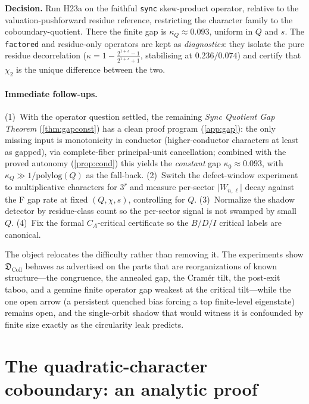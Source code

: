 \documentclass[11pt]{article}
\newcommand{\Dcoll}{\mathfrak{D}_{\mathrm{Coll}}}
\theoremstyle{plain}
\theoremstyle{remark}
\begin{document}
\begin{keystatement}
\textbf{Decision.} Run H23a on the faithful \texttt{sync} skew-product operator,
relative to the valuation-pushforward residue reference, restricting the
character family to the coboundary-quotient. There the finite gap is
$\kappa_Q\approx0.093$, uniform in $Q$ and $s$. The \texttt{factored} and
residue-only operators are kept as \emph{diagnostics}: they isolate the pure
residue decorrelation ($\kappa=1-\tfrac{2^{1+s}-1}{2^{1+s}+1}$, stabilising at
$0.236/0.074$) and certify that $\chi_2$ is the unique difference between the two.
\end{keystatement}

\paragraph{Immediate follow-ups.}
(1)~With the operator question settled, the remaining \emph{Sync Quotient Gap
Theorem} (\cref{thm:gapconst}) has a clean proof program (\cref{app:gap}): the
only missing input is monotonicity in conductor (higher-conductor characters at
least as gapped), via complete-fiber principal-unit cancellation; combined with
the proved autonomy (\cref{prop:cond}) this yields the \emph{constant} gap
$\kappa_0\approx0.093$, with $\kappa_Q\gg1/\mathrm{polylog}(Q)$ as the fall-back.
(2)~Switch the defect-window
experiment to multiplicative characters for $3^r$ and measure per-sector
$\lvert W_{n,\ell}\rvert$ decay against the F gap rate at fixed $(Q,\chi,s)$,
controlling for $Q$. (3)~Normalize the shadow detector by residue-class count so
the per-sector signal is not swamped by small $Q$. (4)~Fix the formal
$C_A$-critical certificate so the $B/D/I$ critical labels are canonical.

The object relocates the difficulty rather than removing it. The experiments show
$\Dcoll$ behaves as advertised on the parts that are reorganizations of known
structure---the congruence, the annealed gap, the Cram\'er tilt, the post-exit
taboo, and a genuine finite operator gap weakest at the critical tilt---while the
one open arrow (a persistent quenched bias forcing a top finite-level eigenstate)
remains open, and the single-orbit shadow that would witness it is confounded by
finite size exactly as the circularity leak predicts.

\appendix
\section{The quadratic-character coboundary: an analytic proof}
\label{app:quad}
\end{document}
